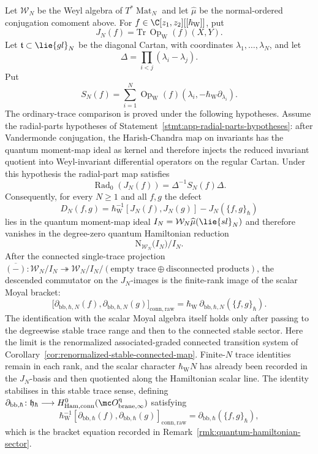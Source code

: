 \documentclass[11pt]{memoir}
\begin{document}
\begin{thm}\label{thm:finite-n-reduced-moyal}
  \label{thm:reduced-moyal-commutator}%
  Let $\mathcal W_N$ be the Weyl algebra of
  $T^*\operatorname{Mat}_N$ and let $\widehat\mu$ be the normal-ordered
  conjugation comoment above. For
  \(f\in\C[z_1,z_2][[\hbar_{\mathrm{W}}]]\), put
  $$J_N(f)=\mathrm{Tr}\,\operatorname{Op}_{\mathrm W}(f)(X,Y).$$
  Let $\mathfrak t\subset\lie{gl}_N$ be the diagonal Cartan, with coordinates
  $\lambda_1,\ldots,\lambda_N$, and let
  $$\Delta=\prod_{i<j}(\lambda_i-\lambda_j).$$
  Put
  $$S_N(f)=\sum_{i=1}^N
      \operatorname{Op}_{\mathrm W}
        (f)(\lambda_i,-\hbar_{\mathrm{W}}\partial_{\lambda_i}).$$
  The ordinary-trace comparison is proved under the following hypotheses.
  Assume the radial-parts hypotheses of
  Statement~\ref{stmt:app-radial-parts-hypotheses}: after
  Vandermonde conjugation, the Harish-Chandra map on invariants has the
  quantum moment-map ideal as kernel and therefore injects the reduced
  invariant quotient into Weyl-invariant differential operators on the
  regular Cartan.  Under this hypothesis the radial-part map satisfies
  $$\operatorname{Rad}_0(J_N(f))=\Delta^{-1}S_N(f)\Delta.$$
  Consequently, for every $N\geq 1$ and all $f,g$ the defect
  $$D_N(f,g)=
    \hbar_{\mathrm{W}}^{-1}[J_N(f),J_N(g)]-J_N(\{f,g\}_\hbar)$$
  lies in the quantum moment-map ideal $I_N=\mathcal W_N\widehat\mu(\lie{sl}_N)$
  and therefore vanishes in the degree-zero quantum Hamiltonian reduction
  $$\mathrm N_{\mathcal W_N}\bigl(I_N\bigr)/I_N.$$
  After the connected single-trace projection
  $\overline{(-)}\colon\mathcal W_N/I_N\twoheadrightarrow
   \mathcal W_N/I_N\big/(\text{empty trace}\oplus\text{disconnected products})$,
  the descended commutator on the \(J_N\)-images is the finite-rank
  image of the scalar Moyal bracket:
  $$\bigl[\partial_{\mathrm{bb},\hbar,N}(f),
    \partial_{\mathrm{bb},\hbar,N}(g)\bigr]_{\mathrm{conn,raw}}
    =\hbar_{\mathrm{W}}\,\partial_{\mathrm{bb},\hbar,N}(\{f,g\}_\hbar).$$
  The identification with the scalar Moyal algebra itself holds only
  after passing to the degreewise stable trace range and then to the
  connected stable sector.
  Here the limit is the renormalized associated-graded
  connected transition system of
  Corollary~\ref{cor:renormalized-stable-connected-map}. Finite-\(N\)
  trace identities remain in each rank, and the scalar character
  \(\hbar_{\mathrm{W}}N\) has already been recorded in the \(J_N\)-basis and then
  quotiented along the Hamiltonian scalar line. The identity stabilises
  in this stable trace sense, defining
  $\partial_{\mathrm{bb},\hbar}\colon\mathfrak h_\hbar\longrightarrow
    H^0_{\mathrm{Ham,conn}}(\mc O^{\mathrm q}_{\mathrm{brane},\infty})$
  satisfying
  $$\hbar_{\mathrm{W}}^{-1}[\partial_{\mathrm{bb},\hbar}(f),
    \partial_{\mathrm{bb},\hbar}(g)]_{\mathrm{conn,raw}}
    =\partial_{\mathrm{bb},\hbar}(\{f,g\}_\hbar),$$
	  which is the bracket equation recorded in
	  Remark~\ref{rmk:quantum-hamiltonian-sector}.


\end{thm}
\end{document}
